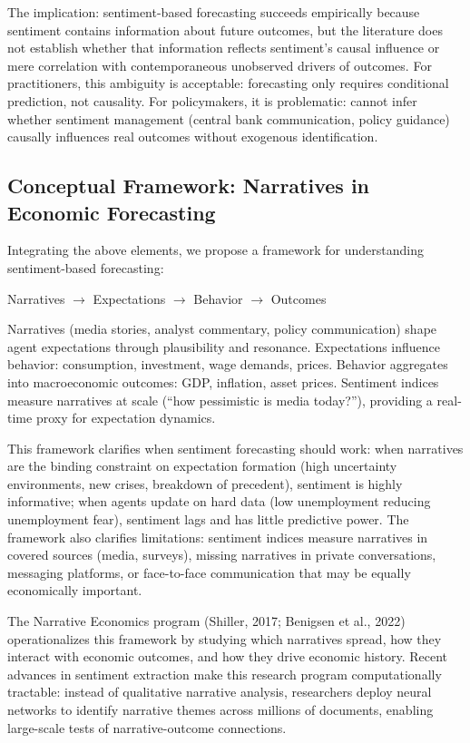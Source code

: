 \documentclass[11pt]{article}
\begin{document}
The implication: sentiment-based forecasting succeeds empirically because sentiment contains information about future outcomes, but the literature does not establish whether that information reflects sentiment's causal influence or mere correlation with contemporaneous unobserved drivers of outcomes. For practitioners, this ambiguity is acceptable: forecasting only requires conditional prediction, not causality. For policymakers, it is problematic: cannot infer whether sentiment management (central bank communication, policy guidance) causally influences real outcomes without exogenous identification.

\subsection{Conceptual Framework: Narratives in Economic Forecasting}

Integrating the above elements, we propose a framework for understanding sentiment-based forecasting:

\noindent
Narratives $\rightarrow$ Expectations $\rightarrow$ Behavior $\rightarrow$ Outcomes

Narratives (media stories, analyst commentary, policy communication) shape agent expectations through plausibility and resonance. Expectations influence behavior: consumption, investment, wage demands, prices. Behavior aggregates into macroeconomic outcomes: GDP, inflation, asset prices. Sentiment indices measure narratives at scale (``how pessimistic is media today?''), providing a real-time proxy for expectation dynamics.

This framework clarifies when sentiment forecasting should work: when narratives are the binding constraint on expectation formation (high uncertainty environments, new crises, breakdown of precedent), sentiment is highly informative; when agents update on hard data (low unemployment reducing unemployment fear), sentiment lags and has little predictive power. The framework also clarifies limitations: sentiment indices measure narratives in covered sources (media, surveys), missing narratives in private conversations, messaging platforms, or face-to-face communication that may be equally economically important.

The Narrative Economics program (Shiller, 2017; Benigsen et al., 2022) operationalizes this framework by studying which narratives spread, how they interact with economic outcomes, and how they drive economic history. Recent advances in sentiment extraction make this research program computationally tractable: instead of qualitative narrative analysis, researchers deploy neural networks to identify narrative themes across millions of documents, enabling large-scale tests of narrative-outcome connections.
\end{document}
